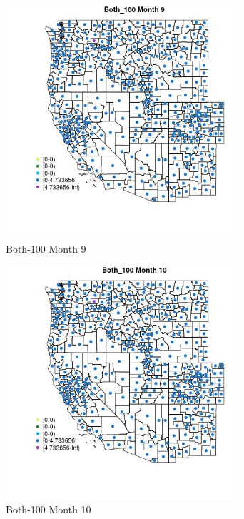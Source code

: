 \begin{figure} 
\centering  
\includegraphics[width=0.77\textwidth]{Code_Outputs/df_report_ML_predictors_CountyCentroid_Locations_Dates_2008-01-01to2018-12-31_MapObsMo9Both_100.jpg} 
\caption{\label{fig:df_report_ML_predictors_CountyCentroid_Locations_Dates_2008-01-01to2018-12-31MapObsMo9Both_100}Both-100 Month 9} 
\end{figure} 
 

\begin{figure} 
\centering  
\includegraphics[width=0.77\textwidth]{Code_Outputs/df_report_ML_predictors_CountyCentroid_Locations_Dates_2008-01-01to2018-12-31_MapObsMo10Both_100.jpg} 
\caption{\label{fig:df_report_ML_predictors_CountyCentroid_Locations_Dates_2008-01-01to2018-12-31MapObsMo10Both_100}Both-100 Month 10} 
\end{figure} 
 


